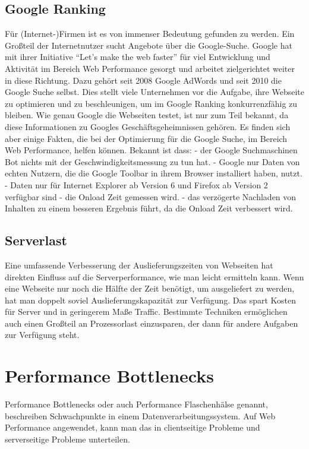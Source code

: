\subsection{Google Ranking}
Für (Internet-)Firmen ist es von immenser Bedeutung gefunden zu werden. Ein Großteil der Internetnutzer sucht Angebote über die Google-Suche. Google hat mit ihrer Initiative ``Let's make the web faster'' für viel Entwicklung und Aktivität im Bereich Web Performance gesorgt und arbeitet zielgerichtet weiter in diese Richtung. Dazu gehört seit  2008 Google AdWords und seit 2010 die Google Suche selbst. Dies stellt viele Unternehmen vor die Aufgabe, ihre Webseite zu optimieren und zu beschleunigen, um im Google Ranking konkurrenzfähig zu bleiben. Wie genau Google die Webseiten testet, ist nur zum Teil bekannt, da diese Informationen zu Googles Geschäftsgeheimnissen gehören. Es finden sich aber einige Fakten, die bei der Optimierung für die Google Suche, im Bereich Web Performance, helfen können.
Bekannt ist dass:
- der Google Suchmaschinen Bot nichts mit der Geschwindigkeitsmessung zu tun hat.
- Google nur Daten von echten Nutzern, die die Google Toolbar in ihrem Browser installiert haben, nutzt.
- Daten nur für Internet Explorer ab Version 6 und Firefox ab Version 2 verfügbar sind
- die Onload Zeit gemessen wird.
- das verzögerte Nachladen von Inhalten zu einem besseren Ergebnis führt, da die Onload Zeit verbessert wird.
%

\subsection{Serverlast}
Eine umfassende Verbesserung der Auslieferungszeiten von Webseiten hat direkten Einfluss auf die Serverperformance, wie man leicht ermitteln kann. Wenn eine Webseite nur noch die Hälfte der Zeit benötigt, um ausgeliefert zu werden, hat man doppelt soviel Auslieferungskapazität zur Verfügung. Das spart Kosten für Server und in geringerem Maße Traffic. Bestimmte Techniken ermöglichen auch einen Großteil an Prozessorlast einzusparen, der dann für andere Aufgaben zur Verfügung steht.

\section{Performance Bottlenecks}
Performance Bottlenecks oder auch Performance Flaschenhälse genannt, beschreiben Schwachpunkte in einem Datenverarbeitungssystem. Auf Web Performance angewendet, kann man das in clientseitige Probleme und serverseitige Probleme unterteilen.
